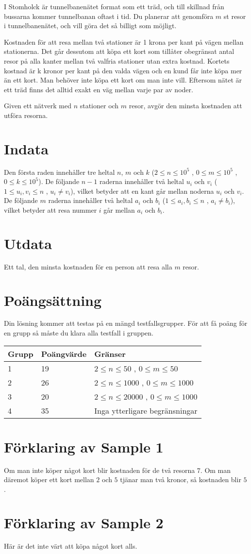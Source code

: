 I Stomholck är tunnelbanenätet format som ett träd, och till skillnad från bussarna kommer tunnelbanan oftast i tid.
Du planerar att genomföra $m$ st resor i tunnelbanenätet, och vill göra det så billigt som möjligt.
 
Kostnaden för att resa mellan två stationer är 1 krona per kant på vägen mellan stationerna. 
Det går dessutom att köpa ett kort som tillåter obegränsat antal resor på alla kanter mellan två valfria stationer utan extra kostnad.
Kortets kostnad är k kronor per kant på den valda vägen och en kund får inte köpa mer än ett kort.
Man behöver inte köpa ett kort om man inte vill. Eftersom nätet är ett träd finns det alltid exakt en väg mellan varje par av noder.

Given ett nätverk med $n$ stationer och $m$ resor, avgör den minsta kostnaden att utföra resorna.

\section*{Indata}
Den första raden innehåller tre heltal $n$, $m$ och $k$ ($2 \leq n \leq 10^5$ , $0 \leq m \leq 10^5$ , $0 \leq k \leq 10^5$).
De följande $n-1$ raderna innehåller två heltal $u_i$ och $v_i$ ($1 \leq u_i , v_i \leq n$ , $u_i \neq v_i$), vilket betyder
att en kant går mellan noderna $u_i$ och $v_i$.
De följande $m$ raderna innehåller två heltal $a_i$ och $b_i$ ($1 \leq a_i , b_i \leq n$ , $a_i \neq b_i$), vilket betyder 
att resa nummer $i$ går mellan $a_i$ och $b_i$.
\section*{Utdata}
Ett tal, den minsta kostnaden för en person att resa alla $m$ resor.
\section*{Poängsättning}
Din lösning kommer att testas på en mängd testfallsgrupper. För att få poäng för en grupp så måste du klara alla testfall i gruppen.

\noindent
\begin{tabular}{| l | l | l |}
\hline
Grupp & Poängvärde & Gränser \\ \hline
1     & 19         &  $2 \le n \le 50$ , $0 \le m \le 50$ \\ \hline
2     & 26         &  $2 \le n \le 1000$ , $0 \le m \le 1000$ \\ \hline
3     & 20         &  $2 \le n \le 20000$ , $0 \le m \le 1000$ \\ \hline
4     & 35         & Inga ytterligare begränsningar \\ \hline
\end{tabular}

\section*{Förklaring av Sample 1}
Om man inte köper något kort blir kostnaden för de två resorna $7$. Om man däremot köper
ett kort mellan $2$ och $5$ tjänar man två kronor, så kostnaden blir $5$.

\section*{Förklaring av Sample 2}
Här är det inte värt att köpa något kort alls.
